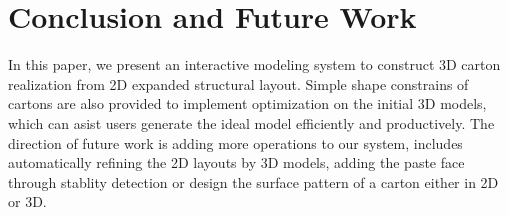 \documentclass[submission]{gmp2018}
\begin{document}

\section{Conclusion and Future Work}\label{sec:conclusion}
In this paper, we present an interactive modeling system to construct 3D carton realization from 2D expanded structural layout. Simple shape constrains of cartons are also provided to implement optimization on the initial 3D models, which can asist users generate the ideal model efficiently and productively. The direction of future work is adding more operations to our system, includes automatically refining the 2D layouts by 3D models, adding the paste face through stablity detection or design the surface pattern of a carton either in 2D or 3D. 




%






\end{document}

